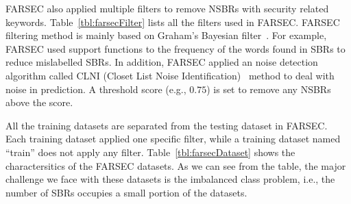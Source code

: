 FARSEC also applied multiple filters to remove NSBRs with security related keywords. Table~\ref{tbl:farsecFilter} lists all the filters used in FARSEC. FARSEC filtering method is mainly based on Graham's Bayesian filter~\cite{graham2004hackers}. For example, FARSEC used support functions to the frequency of the words found in SBRs to reduce mislabelled SBRs. In addition, FARSEC applied an noise detection algorithm called CLNI (Closet List Noise Identification)~\cite{kim2011dealing} method to deal with noise in prediction. A threshold score (e.g., $0.75$) is set to remove any NSBRs above the score.

All the training datasets are separated from the testing dataset in FARSEC. Each training dataset applied one specific filter, while a training dataset named ``train'' does not apply any filter. Table~\ref{tbl:farsecDataset} shows the charactersitics of the FARSEC datasets. As we can see from the table, the major challenge we face with these datasets is the imbalanced class problem, i.e., the number of SBRs occupies a small portion of the datasets.


